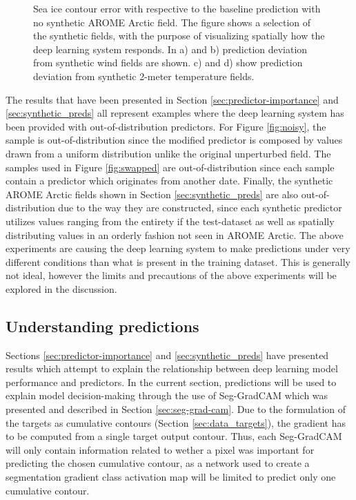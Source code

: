 \documentclass[../main/thesis.tex]{subfiles}
\begin{document}
\begin{figure}
\begin{subfigure}[t]{.455\textwidth}
    \end{subfigure}
    \caption{\label{fig:synthetic_aa_bias}Sea ice contour error with respective to the baseline prediction with no synthetic AROME Arctic field. The figure shows a selection of the synthetic fields, with the purpose of visualizing spatially how the deep learning system responds. In a) and b) prediction deviation from synthetic wind fields are shown. c) and d) show prediction deviation from synthetic 2-meter temperature fields.}
\end{figure}

The results that have been presented in Section \ref{sec:predictor-importance} and \ref{sec:synthetic_preds} all represent examples where the deep learning system has been provided with out-of-distribution predictors. For Figure \ref{fig:noisy}, the sample is out-of-distribution since the modified predictor is composed by values drawn from a uniform distribution unlike the original unperturbed field. The samples used in Figure \ref{fig:swapped} are out-of-distribution since each sample contain a predictor which originates from another date. Finally, the synthetic AROME Arctic fields shown in Section \ref{sec:synthetic_preds} are also out-of-distribution due to the way they are constructed, since each synthetic predictor utilizes values ranging from the entirety if the test-dataset as well as spatially distributing values in an orderly fashion not seen in AROME Arctic. The above experiments are causing the deep learning system to make predictions under very different conditions than what is present in the training dataset. This is generally not ideal, however the limits and precautions of the above experiments will be explored in the discussion.

\subsection{Understanding predictions}
Sections \ref{sec:predictor-importance} and \ref{sec:synthetic_preds} have presented results which attempt to explain the relationship between deep learning model performance and predictors. In the current section, predictions will be used to explain model decision-making through the use of Seg-GradCAM \citep{Vinogradova2020} which was presented and described in Section \ref{sec:seg-grad-cam}. Due to the formulation of the targets as cumulative contours (Section \ref{sec:data_targets}), the gradient has to be computed from a single target output contour. Thus, each Seg-GradCAM will only contain information related to wether a pixel was important for predicting the chosen cumulative contour, as a network used to create a segmentation gradient class activation map will be limited to predict only one cumulative contour. 
\end{document}
